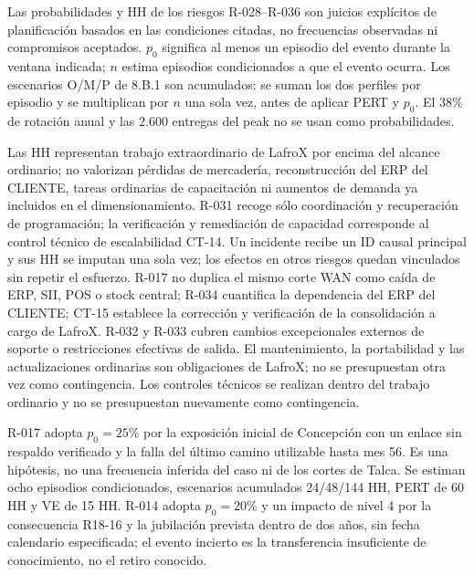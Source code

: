 \documentclass[carta,firma,sinnotas]{lafrox}
\begin{document}
Las probabilidades y HH de los riesgos R-028--R-036 son juicios explícitos de planificación basados en las condiciones citadas, no frecuencias observadas ni compromisos aceptados. $p_0$ significa al menos un episodio del evento durante la ventana indicada; $n$ estima episodios condicionados a que el evento ocurra. Los escenarios O/M/P de 8.B.1 son acumulados: se suman los dos perfiles por episodio y se multiplican por $n$ una sola vez, antes de aplicar PERT y $p_0$. El 38\% de rotación anual y las 2.600 entregas del peak no se usan como probabilidades.

Las HH representan trabajo extraordinario de LafroX por encima del alcance ordinario; no valorizan pérdidas de mercadería, reconstrucción del ERP del CLIENTE, tareas ordinarias de capacitación ni aumentos de demanda ya incluidos en el dimensionamiento. R-031 recoge sólo coordinación y recuperación de programación; la verificación y remediación de capacidad corresponde al control técnico de escalabilidad CT-14. Un incidente recibe un ID causal principal y sus HH se imputan una sola vez; los efectos en otros riesgos quedan vinculados sin repetir el esfuerzo. R-017 no duplica el mismo corte WAN como caída de ERP, SII, POS o stock central; R-034 cuantifica la dependencia del ERP del CLIENTE; CT-15 establece la corrección y verificación de la consolidación a cargo de LafroX. R-032 y R-033 cubren cambios excepcionales externos de soporte o restricciones efectivas de salida. El mantenimiento, la portabilidad y las actualizaciones ordinarias son obligaciones de LafroX; no se presupuestan otra vez como contingencia. Los controles técnicos se realizan dentro del trabajo ordinario y no se presupuestan nuevamente como contingencia.

R-017 adopta $p_0=25\%$ por la exposición inicial de Concepción con un enlace sin respaldo verificado y la falla del último camino utilizable hasta mes 56. Es una hipótesis, no una frecuencia inferida del caso ni de los cortes de Talca. Se estiman ocho episodios condicionados, escenarios acumulados 24/48/144 HH, PERT de 60 HH y VE de 15 HH. R-014 adopta $p_0=20\%$ y un impacto de nivel 4 por la consecuencia R18-16 y la jubilación prevista dentro de dos años, sin fecha calendario especificada; el evento incierto es la transferencia insuficiente de conocimiento, no el retiro conocido.
\end{document}
